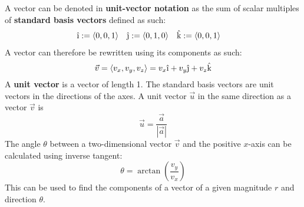 \documentclass[../Calculus_\Roman{3}]{subfiles}
\begin{document}
			A vector can be denoted in \textbf{unit-vector notation} as the sum of scalar multiples of \textbf{standard basis vectors} defined as such:
			\begin{align*}
				\vi &:= \langle 0, 0, 1 \rangle &
					\vj &:= \langle 0, 1, 0 \rangle &
					\vk &:= \langle 0, 0, 1 \rangle
			\end{align*}
			A vector can therefore be rewritten using its components as such:
			\[\vec{v} = \langle v_x, v_y, v_z \rangle = v_x\vi + v_y\vj + v_z\vk\]
			A \textbf{unit vector} is a vector of length 1. The standard basis vectors are unit vectors in the directions of the axes. A unit vector $\vec{u}$ in the same direction as a vector $\vec{v}$ is
			\[\vec{u} = \frac{\vec{a}}{|\vec{a}|}\]
			The angle $\theta$ between a two-dimensional vector $\vec{v}$ and the positive $x$-axis can be calculated using inverse tangent:
			\[\theta = \arctan\left(\frac{v_y}{v_x}\right)\]
			This can be used to find the components of a vector of a given magnitude $r$ and direction $\theta$.
\end{document}
